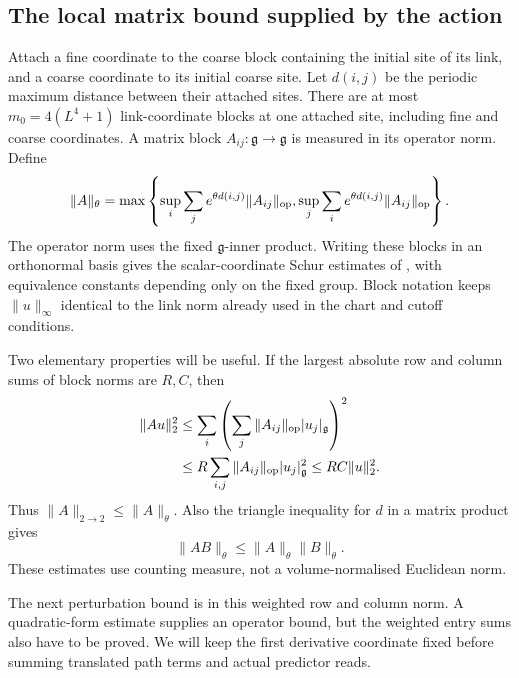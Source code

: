 \documentclass[11pt,reqno]{amsart}
\numberwithin{equation}{section}
\theoremstyle{definition}
\theoremstyle{remark}
\newcommand{\g}{\mathfrak g}
\begin{document}
\subsection{The local matrix bound supplied by the action}

Attach a fine coordinate to the coarse block containing the
initial site of its link, and a coarse coordinate to its initial
coarse site. Let \(d(i,j)\) be the periodic maximum distance
between their attached sites. There are at most
\(m_0=4(L^4+1)\) link-coordinate blocks at one attached site,
including fine and coarse coordinates. A matrix block
\(A_{ij}:\g\to\g\) is measured in its operator norm. Define
\begin{equation}
 \|A\|_\theta=
       \max\left\{\sup_i\sum_j e^{\theta d(i,j)}\|A_{ij}\|_{\rm op},
                  \sup_j\sum_i e^{\theta d(i,j)}\|A_{ij}\|_{\rm op}
           \right\}.
 \label{eq:weighted-local-matrix}
\end{equation}
The operator norm uses the fixed \(\g\)-inner product. Writing
these blocks in an orthonormal basis gives the scalar-coordinate
Schur estimates of \cite[(14.25), p.~67]{Main}, with equivalence
constants depending only on the fixed group. Block notation
keeps \(\|u\|_\infty\) identical to the link norm already used
in the chart and cutoff conditions.

Two elementary properties will be useful. If the largest absolute
row and column sums of block norms are \(R,C\), then
\begin{align*}
 \|Au\|_2^2
 &\le\sum_i\left(\sum_j\|A_{ij}\|_{\rm op}|u_j|_{\g}\right)^2\\
 &\le R\sum_{i,j}\|A_{ij}\|_{\rm op}|u_j|_{\g}^2
 \le RC\|u\|_2^2.
\end{align*}
Thus \(\|A\|_{2\to2}\le\|A\|_\theta\). Also the triangle
inequality for \(d\) in a matrix product gives
\begin{equation}
                        \|AB\|_\theta\le\|A\|_\theta\|B\|_\theta.
 \label{eq:weighted-product}
\end{equation}
These estimates use counting measure, not a volume-normalised
Euclidean norm.

The next perturbation bound is in this weighted row and column
norm. A quadratic-form estimate supplies an operator bound,
but the weighted entry sums also have to be proved. We will
keep the first derivative coordinate fixed before summing
translated path terms and actual predictor reads.
\end{document}
